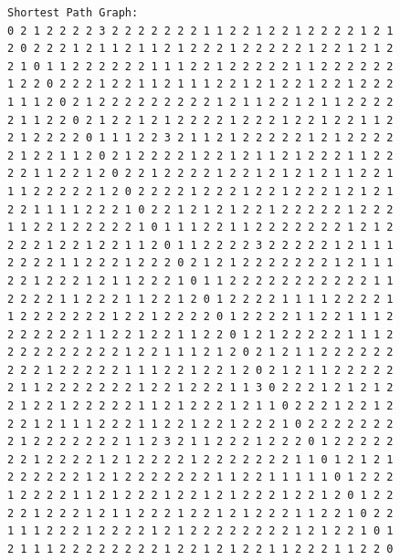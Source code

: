 \documentclass[11pt]{article}
\begin{document}
\begin{lstlisting}
Shortest Path Graph:
0 2 1 2 2 2 2 3 2 2 2 2 2 2 2 1 1 2 2 1 2 2 1 2 2 2 2 1 2 1
2 0 2 2 2 1 2 1 1 2 1 1 2 1 2 2 2 1 2 2 2 2 2 1 2 2 1 2 1 2
2 1 0 1 1 2 2 2 2 2 2 1 1 1 2 2 1 2 2 2 2 2 1 1 2 2 2 2 2 2
1 2 2 0 2 2 2 1 2 2 1 1 2 1 1 1 2 2 1 2 1 2 2 1 2 2 1 2 2 2
1 1 1 2 0 2 1 2 2 2 2 2 2 2 2 2 1 2 1 1 2 2 1 2 1 1 2 2 2 2
2 1 1 2 2 0 2 1 2 2 1 2 1 2 2 2 2 1 2 2 2 1 2 2 1 2 2 1 1 2
2 1 2 2 2 2 0 1 1 1 2 2 3 2 1 1 2 1 2 2 2 2 2 1 2 1 2 2 2 2
2 1 2 2 1 1 2 0 2 1 2 2 2 2 1 2 2 1 2 1 1 2 1 2 2 2 1 1 2 2
2 2 1 1 2 2 1 2 0 2 2 1 2 2 2 2 1 2 2 1 2 1 2 1 2 1 1 2 2 1
1 1 2 2 2 2 2 1 2 0 2 2 2 2 1 2 2 2 1 2 2 1 2 2 2 1 2 1 2 1
2 2 1 1 1 1 2 2 2 1 0 2 2 1 2 1 2 1 2 2 1 2 2 2 2 2 1 2 2 2
1 1 2 2 1 2 2 2 2 2 1 0 1 1 1 2 2 1 1 2 2 2 2 2 2 2 1 2 1 2
2 2 2 1 2 2 1 2 2 1 1 2 0 1 1 2 2 2 2 3 2 2 2 2 2 1 2 1 1 1
2 2 2 2 1 1 2 2 2 1 2 2 2 0 2 1 2 1 2 2 2 2 2 2 2 1 2 1 1 1
2 2 1 2 2 2 1 2 1 1 2 2 2 1 0 1 1 2 2 2 2 2 2 2 2 2 2 2 1 1
2 2 2 2 1 1 2 2 2 1 1 2 2 1 2 0 1 2 2 2 2 1 1 1 1 2 2 2 2 1
1 2 2 2 2 2 2 2 1 2 2 1 2 2 2 2 0 1 2 2 2 2 1 1 2 2 1 1 1 2
2 2 2 2 2 2 1 1 2 2 1 2 2 1 1 2 2 0 1 2 1 2 2 2 2 2 1 1 1 2
2 2 2 2 2 2 2 2 2 1 2 2 1 1 1 2 1 2 0 2 1 2 1 1 2 2 2 2 2 2
2 2 2 1 2 2 2 2 2 1 1 1 2 2 1 2 2 1 2 0 2 1 2 1 1 2 2 2 2 2
2 1 1 2 2 2 2 2 2 2 1 2 2 1 2 2 2 1 1 3 0 2 2 2 1 2 1 2 1 2
2 1 2 2 1 2 2 2 2 2 1 1 2 1 2 2 2 1 2 1 1 0 2 2 2 1 2 2 1 2
2 2 1 2 1 1 1 2 2 2 1 1 2 2 1 2 2 1 2 2 2 1 0 2 2 2 2 2 2 2
2 1 2 2 2 2 2 2 2 1 1 2 3 2 1 1 2 2 2 1 2 2 2 0 1 2 2 2 2 2
2 2 1 2 2 2 2 1 2 1 2 2 2 2 1 2 2 2 2 2 2 2 1 1 0 1 2 1 2 1
2 2 2 2 2 2 1 2 1 2 2 2 2 2 2 2 1 1 2 2 1 1 1 1 1 0 1 2 2 2
1 2 2 2 2 1 1 2 1 2 2 2 1 2 2 1 2 1 2 2 2 1 2 2 1 2 0 1 2 2
2 2 1 2 2 2 1 2 1 1 2 2 2 1 2 2 1 2 1 2 2 2 1 1 2 2 1 0 2 2
1 1 1 2 2 2 1 2 2 2 2 1 2 1 2 2 2 2 2 2 2 2 1 2 1 2 2 1 0 1
2 1 1 1 2 2 2 2 2 2 2 2 1 2 2 1 2 1 2 2 1 1 2 2 2 1 1 2 2 0


\end{lstlisting}
\end{document}
